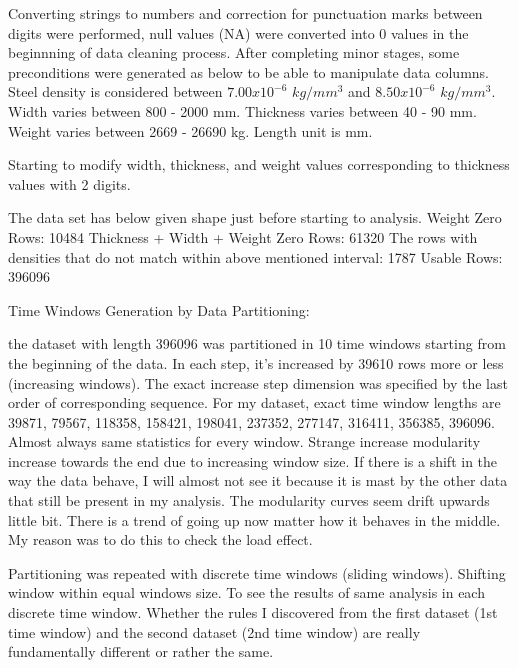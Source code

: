 \documentclass{article}
\begin{document}
Converting strings to numbers and correction for punctuation marks between digits were performed, null values (NA) were converted into $0$ values in the beginnning of data cleaning process. After completing minor stages, some preconditions were generated as below to be able to manipulate data columns.
Steel density is considered between $7.00 x 10^{-6}$ $kg/mm^{3}$ and $8.50x10^{-6}$ $kg/mm^{3}$.
Width varies between 800 - 2000 mm. 
Thickness varies between 40 - 90 mm. 
Weight varies between 2669 - 26690 kg.
Length unit is mm.

Starting to modify width, thickness, and weight values corresponding to thickness values with 2 digits.

The data set has below given shape just before starting to analysis.
Weight Zero Rows: 10484
Thickness + Width + Weight Zero Rows: 61320
The rows with densities that do not match within above mentioned interval: 1787
Usable Rows: 396096

Time Windows Generation by Data Partitioning:

the dataset with length 396096 was partitioned in 10 time windows starting from the beginning of the data. In each step, it's increased by 39610 rows more or less (increasing windows). The exact increase step dimension was specified by the last order of corresponding sequence. For my dataset, exact time window lengths are 39871, 79567, 118358, 158421, 198041, 237352, 277147, 316411, 356385, 396096. Almost always same statistics for every window. Strange increase modularity increase towards the end due to increasing window size. If there is a shift in the way the data behave, I will almost not see it because it is mast by the other data that still be present in my analysis. The modularity curves seem drift upwards little bit. There is a trend of going up now matter how it behaves in the middle. My reason was to do this to check the load effect.

Partitioning was repeated with discrete time windows (sliding windows). Shifting window within equal windows size. To see the results of same analysis in each discrete time window. Whether the rules I discovered from the first dataset (1st time window) and the second dataset (2nd time window) are really fundamentally different or rather the same.
\end{document}
